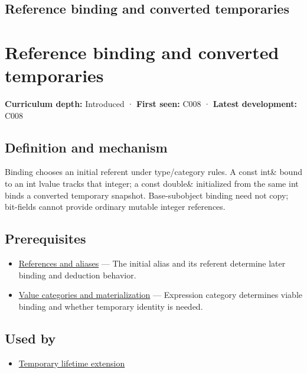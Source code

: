 \hypertarget{appendix-37856d997bb0}{}
\section*{Reference binding and converted temporaries}
\chapter{Reference binding and converted temporaries}\label{appendix-37856d997bb0-reference-binding-and-converted-temporaries}

\textbf{Curriculum depth:} Introduced · \textbf{First seen:} C008 · \textbf{Latest development:} C008

\section{Definition and mechanism}\label{appendix-37856d997bb0-definition-and-mechanism}

Binding chooses an initial referent under type/category rules. A const int\& bound to an int lvalue tracks that integer; a const double\& initialized from the same int binds a converted temporary snapshot. Base-subobject binding need not copy; bit-fields cannot provide ordinary mutable integer references.

\section{Prerequisites}\label{appendix-37856d997bb0-prerequisites}

\begin{itemize}
\tightlist
\item
  \hyperref[appendix-d6d562ca9fbb]{References and aliases} --- The initial alias and its referent determine later binding and deduction behavior.
\item
  \hyperref[appendix-1121b30eaeb0]{Value categories and materialization} --- Expression category determines viable binding and whether temporary identity is needed.
\end{itemize}

\section{Used by}\label{appendix-37856d997bb0-used-by}

\begin{itemize}
\tightlist
\item
  \hyperref[appendix-a978b29bbbb0]{Temporary lifetime extension}
\end{itemize}

